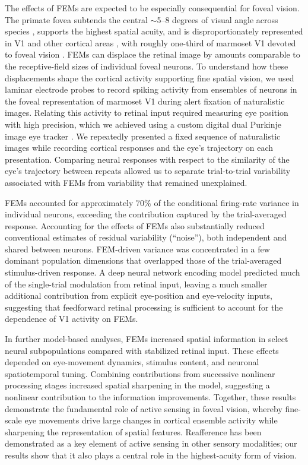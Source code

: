\documentclass{lite}
\begin{document}
The effects of FEMs are expected to be especially consequential for foveal vision. The primate fovea subtends the central $\sim$5--8 degrees of visual angle across species \cite{franco2000conservation}, supports the highest spatial acuity, and is disproportionately represented in V1 and other cortical areas \cite{fritsches1996visuotopic}, with roughly one-third of marmoset V1 devoted to foveal vision \cite{chaplin2013representation}. FEMs can displace the retinal image by amounts comparable to the receptive-field sizes of individual foveal neurons. To understand how these displacements shape the cortical activity supporting fine spatial vision, we used laminar electrode probes to record spiking activity from ensembles of neurons in the foveal representation of marmoset V1 during alert fixation of naturalistic images. Relating this activity to retinal input required measuring eye position with high precision, which we achieved using a custom digital dual Purkinje image eye tracker \cite{yates2023detailed, wu2023high, ressmeyer2025openirisdpi}. We repeatedly presented a fixed sequence of naturalistic images while recording cortical responses and the eye's trajectory on each presentation. Comparing neural responses with respect to the similarity of the eye's trajectory between repeats allowed us to separate trial-to-trial variability associated with FEMs from variability that remained unexplained.

FEMs accounted for approximately 70\% of the conditional firing-rate variance in individual neurons, exceeding the contribution captured by the trial-averaged response. Accounting for the effects of FEMs also substantially reduced conventional estimates of residual variability (``noise''), both independent and shared between neurons. FEM-driven variance was concentrated in a few dominant population dimensions that overlapped those of the trial-averaged stimulus-driven response. A deep neural network encoding model predicted much of the single-trial modulation from retinal input, leaving a much smaller additional contribution from explicit eye-position and eye-velocity inputs, suggesting that feedforward retinal processing is sufficient to account for the dependence of V1 activity on FEMs.

In further model-based analyses, FEMs increased spatial information in select neural subpopulations compared with stabilized retinal input. These effects depended on eye-movement dynamics, stimulus content, and neuronal spatiotemporal tuning. Combining contributions from successive nonlinear processing stages increased spatial sharpening in the model, suggesting a nonlinear contribution to the information improvements. Together, these results demonstrate the fundamental role of active sensing in foveal vision, whereby fine-scale eye movements drive large changes in cortical ensemble activity while sharpening the representation of spatial features. Reafference has been demonstrated as a key element of active sensing in other sensory modalities; our results show that it also plays a central role in the highest-acuity form of vision.
\end{document}
